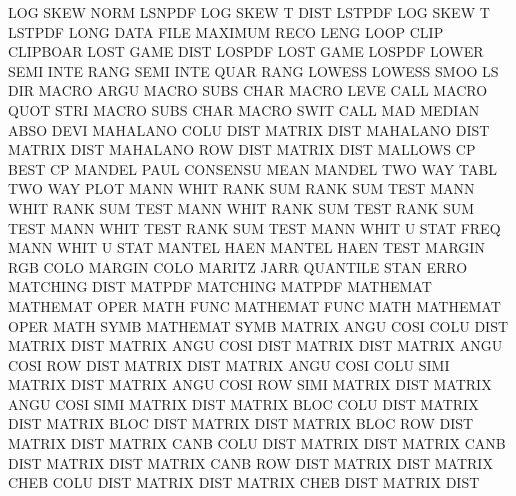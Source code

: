 LOG      SKEW NORM                      LSNPDF
LOG      SKEW T    DIST                 LSTPDF
LOG      SKEW T                         LSTPDF
LONG     DATA FILE                      MAXIMUM  RECO LENG
LOOP     CLIP                           CLIPBOAR
LOST     GAME DIST                      LOSPDF
LOST     GAME                           LOSPDF
LOWER    SEMI INTE RANG                 SEMI     INTE QUAR RANG
LOWESS                                  LOWESS   SMOO
LS                                      DIR
MACRO    ARGU                           MACRO    SUBS CHAR
MACRO    LEVE                           CALL
MACRO    QUOT STRI                      MACRO    SUBS CHAR
MACRO    SWIT                           CALL
MAD                                     MEDIAN   ABSO DEVI
MAHALANO COLU DIST                      MATRIX   DIST
MAHALANO DIST                           MATRIX   DIST
MAHALANO ROW  DIST                      MATRIX   DIST
MALLOWS  CP                             BEST     CP
MANDEL   PAUL                           CONSENSU MEAN
MANDEL   TWO  WAY  TABL                 TWO      WAY  PLOT
MANN     WHIT RANK SUM                  RANK     SUM  TEST
MANN     WHIT                           RANK     SUM  TEST
MANN     WHIT RANK SUM  TEST            RANK     SUM  TEST
MANN     WHIT TEST                      RANK     SUM  TEST
MANN     WHIT U    STAT FREQ            MANN     WHIT U    STAT
MANTEL   HAEN                           MANTEL   HAEN TEST
MARGIN   RGB  COLO                      MARGIN   COLO
MARITZ   JARR                           QUANTILE STAN ERRO
MATCHING DIST                           MATPDF
MATCHING                                MATPDF
MATHEMAT                                MATHEMAT OPER
MATH     FUNC                           MATHEMAT FUNC
MATH                                    MATHEMAT OPER
MATH     SYMB                           MATHEMAT SYMB
MATRIX   ANGU COSI COLU DIST            MATRIX   DIST
MATRIX   ANGU COSI DIST                 MATRIX   DIST
MATRIX   ANGU COSI ROW  DIST            MATRIX   DIST
MATRIX   ANGU COSI COLU SIMI            MATRIX   DIST
MATRIX   ANGU COSI ROW  SIMI            MATRIX   DIST
MATRIX   ANGU COSI SIMI                 MATRIX   DIST
MATRIX   BLOC COLU DIST                 MATRIX   DIST
MATRIX   BLOC DIST                      MATRIX   DIST
MATRIX   BLOC ROW  DIST                 MATRIX   DIST
MATRIX   CANB COLU DIST                 MATRIX   DIST
MATRIX   CANB DIST                      MATRIX   DIST
MATRIX   CANB ROW  DIST                 MATRIX   DIST
MATRIX   CHEB COLU DIST                 MATRIX   DIST
MATRIX   CHEB DIST                      MATRIX   DIST
